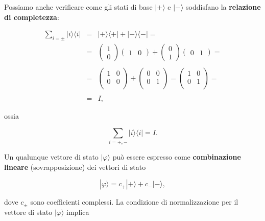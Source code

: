 \documentclass[a4paper,12pt,oneside]{book}
\begin{document}
Possiamo anche verificare come gli stati di base $| + \rangle $ e $| - \rangle$ soddisfano la \textbf{relazione di completezza}:

\begin{eqnarray}
\sum \limits_{i=\pm} | i \rangle \langle i |  & = & | + \rangle \langle + |  + | - \rangle \langle - |  = \nonumber \\
& = &\begin{pmatrix}
1 \\
0
\end{pmatrix}
\begin{pmatrix}
1 & 0
\end{pmatrix} + 
\begin{pmatrix}
0 \\
1
\end{pmatrix}
\begin{pmatrix}
0 & 1
\end{pmatrix}= \nonumber  \\
\nonumber \\
& = & \begin{pmatrix}
1 & 0 \\
0 & 0 \\
\end{pmatrix}+
\begin{pmatrix}
0 & 0 \\
0 & 1 \\
\end{pmatrix}=
\begin{pmatrix}
1 & 0 \\
0 & 1 \\
\end{pmatrix}= \nonumber \\
\nonumber \\
& = & I  ,
\end{eqnarray}

ossia

\begin{equation}
\sum \limits_{i=+,-} | i \rangle \langle i | = I .
\end{equation}

Un qualunque vettore di stato $| \varphi \rangle $ può essere espresso come \textbf{combinazione lineare} (sovrapposizione) dei vettori di stato

\begin{equation}
| \varphi \rangle = c_+ | + \rangle + c_- | - \rangle ,
\end{equation}

dove $c_{\pm}$ sono coefficienti complessi. La condizione di normalizzazione per il vettore di stato $ | \varphi \rangle $ implica
\end{document}
